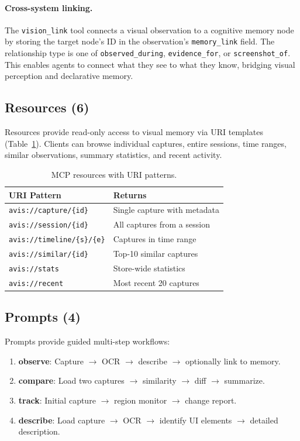 \documentclass[10pt, twocolumn]{article}
\begin{document}
\paragraph{Cross-system linking.} The \texttt{vision\_link} tool connects a visual observation to a cognitive memory node by storing the target node's ID in the observation's \texttt{memory\_link} field. The relationship type is one of \texttt{observed\_during}, \texttt{evidence\_for}, or \texttt{screenshot\_of}. This enables agents to connect what they see to what they know, bridging visual perception and declarative memory.

\subsection{Resources (6)}

Resources provide read-only access to visual memory via URI templates (Table~\ref{tab:resources}). Clients can browse individual captures, entire sessions, time ranges, similar observations, summary statistics, and recent activity.

\begin{table}[t]
\caption{MCP resources with URI patterns.}
\label{tab:resources}
\centering
\small
\begin{tabular}{@{}lp{3.5cm}@{}}
\toprule
\textbf{URI Pattern} & \textbf{Returns} \\
\midrule
\texttt{avis://capture/\{id\}} & Single capture with metadata \\
\texttt{avis://session/\{id\}} & All captures from a session \\
\texttt{avis://timeline/\{s\}/\{e\}} & Captures in time range \\
\texttt{avis://similar/\{id\}} & Top-10 similar captures \\
\texttt{avis://stats} & Store-wide statistics \\
\texttt{avis://recent} & Most recent 20 captures \\
\bottomrule
\end{tabular}
\end{table}

\subsection{Prompts (4)}

Prompts provide guided multi-step workflows:

\begin{enumerate}[nosep,leftmargin=*]
\item \textbf{observe}: Capture $\rightarrow$ OCR $\rightarrow$ describe $\rightarrow$ optionally link to memory.
\item \textbf{compare}: Load two captures $\rightarrow$ similarity $\rightarrow$ diff $\rightarrow$ summarize.
\item \textbf{track}: Initial capture $\rightarrow$ region monitor $\rightarrow$ change report.
\item \textbf{describe}: Load capture $\rightarrow$ OCR $\rightarrow$ identify UI elements $\rightarrow$ detailed description.
\end{enumerate}
\end{document}
